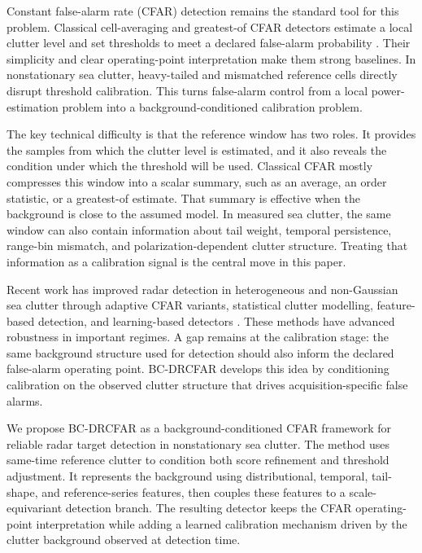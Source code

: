 \documentclass[preprint,12pt]{elsarticle}
\begin{document}
Constant false-alarm rate (CFAR) detection remains the standard tool for this
problem. Classical cell-averaging and greatest-of CFAR detectors estimate a
local clutter level and set thresholds to meet a declared false-alarm
probability \cite{rohling1983cfar,hansen1980go,kelly1986adaptive}. Their simplicity and clear
operating-point interpretation make them strong baselines. In nonstationary sea
clutter, heavy-tailed and mismatched reference cells directly disrupt threshold
calibration. This turns false-alarm control from a local power-estimation
problem into a background-conditioned calibration problem.

The key technical difficulty is that the reference window has two roles. It
provides the samples from which the clutter level is estimated, and it also
reveals the condition under which the threshold will be used. Classical CFAR
mostly compresses this window into a scalar summary, such as an average, an
order statistic, or a greatest-of estimate. That summary is effective when the
background is close to the assumed model. In measured sea clutter, the same
window can also contain information about tail weight, temporal persistence,
range-bin mismatch, and polarization-dependent clutter structure. Treating that
information as a calibration signal is the central move in this paper.

Recent work has improved radar detection in heterogeneous and non-Gaussian sea
clutter through adaptive CFAR variants, statistical clutter modelling,
feature-based detection, and learning-based detectors
\cite{xue2022adaptive,rihan2024cfar,mungara2024heterogeneous,conte2002recursive,sangston2012heavytailed}.
These methods
have advanced robustness in important regimes. A gap remains at the calibration
stage: the same background structure used for detection should also inform the
declared false-alarm operating point. BC-DRCFAR develops this idea by
conditioning calibration on the observed clutter structure that drives
acquisition-specific false alarms.

We propose BC-DRCFAR as a background-conditioned CFAR framework for reliable
radar target detection in nonstationary sea clutter. The method uses same-time
reference clutter to condition both score refinement and threshold adjustment.
It represents the background using distributional, temporal, tail-shape, and
reference-series features, then couples these features to a scale-equivariant
detection branch. The resulting detector keeps the CFAR operating-point
interpretation while adding a learned calibration mechanism driven by the
clutter background observed at detection time.
\end{document}
